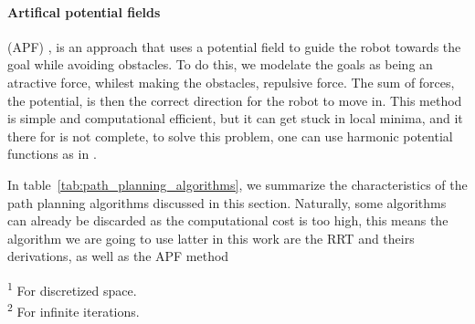\paragraph{Artifical potential fields} (APF) \cite{khatib1985real}, is an approach that uses a potential field to guide the robot towards the goal while avoiding obstacles. To do this, we modelate the goals as being an atractive force, whilest making the obstacles, repulsive force. The sum of forces, the potential, is then the correct direction for the robot to move in. This method is simple and computational efficient, but it can get stuck in local minima, and it there for is not complete, to solve this problem, one can use harmonic potential functions as in \cite{kim1992real,rimon1990exact}.

In table~\ref{tab:path_planning_algorithms}, we summarize the characteristics of the path planning algorithms discussed in this section. Naturally, some algorithms can already be discarded as the computational cost is too high, this means the algorithm we are going to use latter in this work are the RRT and theirs derivations, as well as the APF method


\begin{table}[h]
    \centering
    \caption{Path planning algorithms characteristics.}
    \label{tab:path_planning_algorithms}
    
    \vspace{0.5em}
    \raggedright
    \textsuperscript{1} For discretized space.\\
    \textsuperscript{2} For infinite iterations.
\end{table}
    